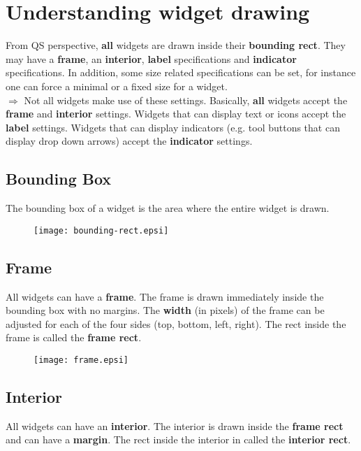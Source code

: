 \documentclass[a4paper,12pt]{report}
\begin{document}
\section{Understanding widget drawing}
From QS perspective, \textbf{all} widgets are drawn inside their
\textbf{bounding rect}. They may have a \textbf{frame}, an \textbf{interior},
\textbf{label} specifications and \textbf{indicator} specifications. In
addition, some size related specifications can be set, for instance one can
force a minimal or a fixed size for a widget.\\

$\Rightarrow$ Not all widgets make use of these settings. Basically,
\textbf{all} widgets accept the \textbf{frame} and \textbf{interior} settings.
Widgets that can display text or icons accept the \textbf{label} settings.
Widgets that can display indicators (e.g. tool buttons that can display drop
down arrows) accept the \textbf{indicator} settings.\\

\subsection{Bounding Box}
The bounding box of a widget is the area where the entire widget is drawn.

\begin{figure}[hbtp]
  \centering
  \texttt{[image: bounding-rect.epsi]}
\end{figure}

\subsection{Frame}
All widgets can have a \textbf{frame}. The frame is drawn immediately inside the
bounding box with no margins. The \textbf{width} (in pixels) of the frame can be
adjusted for each of the four sides (top, bottom, left, right). The rect
inside the frame is called the \textbf{frame rect}.\\

\begin{figure}[hbtp]
  \centering
  \texttt{[image: frame.epsi]}
\end{figure}

\subsection{Interior}
All widgets can have an \textbf{interior}. The interior is drawn inside the
\textbf{frame rect} and can have a \textbf{margin}. The rect inside the
interior in called the \textbf{interior rect}.\\
\end{document}
